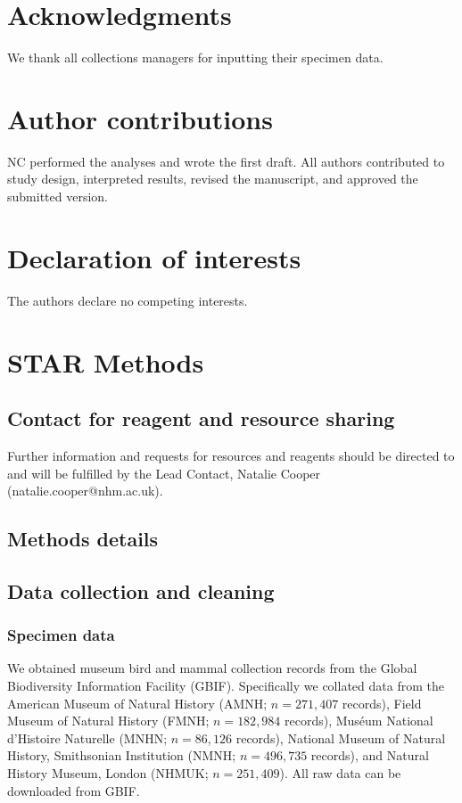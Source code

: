 \documentclass[a4paper, 12pt]{article}
\begin{document}
\section{Acknowledgments}
We thank all collections managers for inputting their specimen data.

\section{Author contributions}
NC performed the analyses and wrote the first draft. All authors contributed to study design, interpreted results, revised the manuscript, and approved the submitted version.

\section{Declaration of interests}
The authors declare no competing interests.

\section{STAR Methods}

\subsection{Contact for reagent and resource sharing}
Further information and requests for resources and reagents should be directed to and will be fulfilled by the Lead Contact, Natalie Cooper (natalie.cooper@nhm.ac.uk).

\subsection{Methods details}
\subsection{Data collection and cleaning}
\subsubsection{Specimen data} 
We obtained museum bird and mammal collection records from the Global Biodiversity Information Facility (GBIF\cite{gbif}). 
Specifically we collated data from the American Museum of Natural History (AMNH; $n = 271,407$ records\cite{amnh-birds,amnh-mammals}), Field Museum of Natural History (FMNH; $n = 182,984$ records\cite{fmnh-birds,fmnh-mammals}), Mus\'{e}um National d'Histoire Naturelle (MNHN; $n = 86,126$ records\cite{mnhn-birds,mnhn-mammals}), National Museum of Natural History, Smithsonian Institution (NMNH; $n = 496,735$ records\cite{smithsonian-both}), and Natural History Museum, London (NHMUK; $n = 251,409$\cite{nhm-all}).
 All raw data can be downloaded from GBIF\cite{gbif}.
\end{document}

